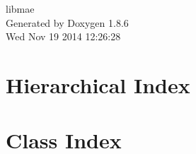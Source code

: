 \documentclass[twoside]{book}
\newcommand{\clearemptydoublepage}{%
  \newpage{\pagestyle{empty}\cleardoublepage}%
}
\begin{document}
\hypersetup{pageanchor=false}
\begin{titlepage}
\vspace*{7cm}
\begin{center}%
{\Large libmae }\\
\vspace*{1cm}
{\large Generated by Doxygen 1.8.6}\\
\vspace*{0.5cm}
{\small Wed Nov 19 2014 12:26:28}\\
\end{center}
\end{titlepage}
\clearemptydoublepage
\tableofcontents
\clearemptydoublepage
{}
\hypersetup{pageanchor=true}

\chapter{Hierarchical Index}

\chapter{Class Index}

\end{document}
